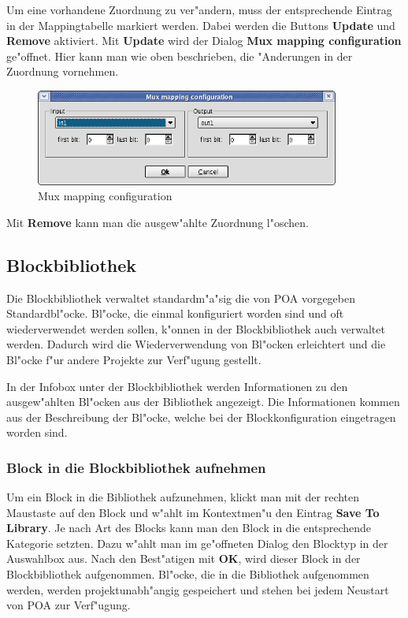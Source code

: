 \documentclass[a4paper,titlepage,12pt,ngerman]{scrbook}
\begin{document}
Um eine vorhandene Zuordnung zu ver"andern, muss der entsprechende Eintrag in der Mappingtabelle markiert werden. Dabei werden die Buttons {\bf Update} und {\bf Remove} aktiviert.\newline
Mit {\bf Update} wird der Dialog {\bf Mux mapping configuration} ge"offnet. Hier kann man wie oben beschrieben, die "Anderungen in der Zuordnung vornehmen.\newline

\begin{figure}[htbp]

\begin{center}

\includegraphics[width=10cm]{Muxzuordnung}

\caption{Mux mapping configuration}\label{test}

\end{center}

\end{figure}

Mit {\bf Remove} kann man die ausgew"ahlte Zuordnung l"oschen.\par


\subsection{Blockbibliothek}
Die Blockbibliothek verwaltet standardm"a"sig die von POA vorgegeben Standardbl"ocke.
Bl"ocke, die einmal konfiguriert worden sind und oft wiederverwendet werden sollen, 
k"onnen in der Blockbibliothek auch verwaltet werden. Dadurch wird die Wiederverwendung
von Bl"ocken erleichtert und die Bl"ocke f"ur andere Projekte zur Verf"ugung gestellt.\par
In der Infobox unter der Blockbibliothek werden Informationen zu den ausgew"ahlten Bl"ocken aus der Bibliothek angezeigt. Die Informationen kommen aus der Beschreibung der Bl"ocke, welche bei der Blockkonfiguration eingetragen worden sind.
\subsubsection{Block in die Blockbibliothek aufnehmen}
Um ein Block in die Bibliothek aufzunehmen, klickt man mit der rechten Maustaste
auf den Block und w"ahlt im Kontextmen"u den Eintrag {\bf Save To Library}. Je nach Art des Blocks kann man den Block in die entsprechende Kategorie setzten. Dazu w"ahlt man im ge"offneten Dialog den Blocktyp in der Auswahlbox aus. Nach den Best"atigen mit {\bf OK}, wird dieser Block in der Blockbibliothek aufgenommen.\newline
Bl"ocke, die in die Bibliothek aufgenommen werden, werden projektunabh"angig gespeichert
und stehen bei jedem Neustart von POA zur Verf"ugung.
\end{document}
